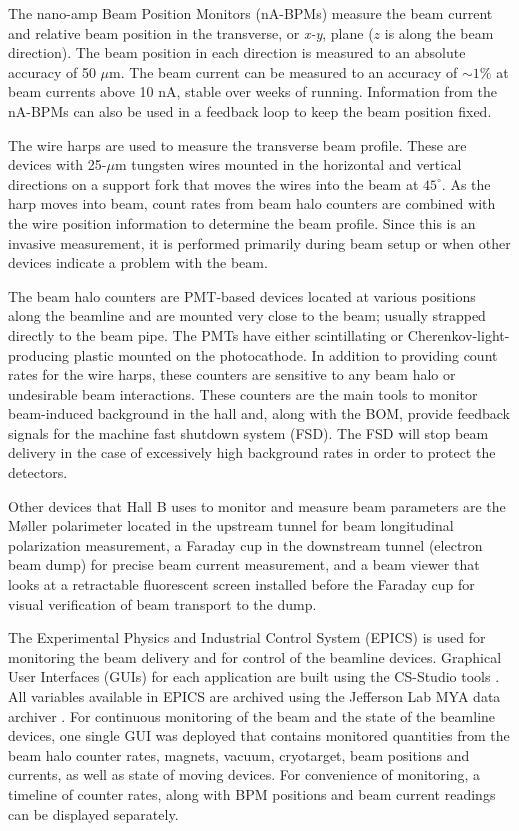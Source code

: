The nano-amp Beam Position Monitors (nA-BPMs) \cite{naBPM} measure the beam current and relative beam position in the transverse, 
or {\it x-y}, plane ($z$ is along the beam direction).  The beam position in each direction is measured to an absolute accuracy 
of 50 $\mu$m. The beam current can be measured to an accuracy of $\sim 1\%$ at beam currents above 10 nA, stable over weeks of
running.  Information from the nA-BPMs can also be used in a feedback  loop to keep the beam position fixed.

The wire harps \cite{wireharp} are used to measure the transverse beam profile. These are devices with 25-$\mu$m tungsten wires 
mounted in the horizontal and vertical directions on a support fork that moves the wires into the beam at $45^\circ$. As 
the harp moves into beam, count rates from beam halo counters are combined with the wire position information to determine the beam profile.
Since this is an invasive measurement, it is performed primarily during beam setup or when other devices indicate a problem with the beam. 

The beam halo counters are PMT-based devices located at various positions along the beamline and are mounted very close to the 
beam; usually strapped directly to the beam pipe. The PMTs have either scintillating or Cherenkov-light-producing plastic mounted on 
the photocathode. In addition to providing count rates for the wire harps, these counters are sensitive to any beam halo or undesirable 
beam interactions. These counters are the main tools to monitor beam-induced background in the hall and, along with the BOM, provide 
feedback signals for the machine fast shutdown system (FSD). The FSD will stop beam delivery in the case of excessively high background
rates in order to protect the detectors. 

Other devices that Hall B uses to monitor and measure beam parameters are the M{\o}ller polarimeter located in the upstream tunnel for beam 
longitudinal polarization measurement, a Faraday cup in the downstream tunnel (electron beam dump) for precise beam current measurement, 
and a beam viewer that looks at a retractable fluorescent screen installed before the Faraday cup for visual verification of beam transport to 
the dump.     

The Experimental Physics and Industrial Control System (EPICS) \cite{EPICS} is used for monitoring the beam delivery and for control 
of the beamline devices. Graphical User Interfaces (GUIs) for each application are built using the CS-Studio tools \cite{CS-Studio}. All 
variables available in EPICS are archived using the Jefferson Lab MYA data archiver \cite{MYA}. For continuous monitoring of the beam
and the state of the beamline devices, one single GUI was deployed that contains monitored quantities from the beam halo counter rates,
magnets, vacuum, cryotarget, beam positions and currents, as well as state of moving devices. For convenience of monitoring, a timeline 
of counter rates, along with BPM positions and beam current readings can be displayed separately.  

